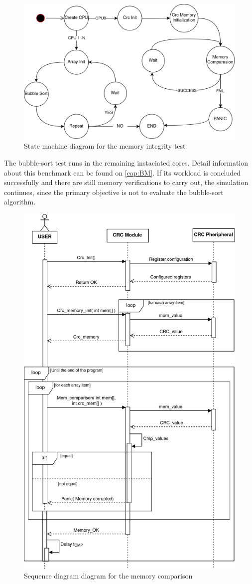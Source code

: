 \begin{figure}[H]
	\centering
 	\includegraphics[width=0.7\linewidth]{Images/MemoryIntegrity_StateDiagram.png}
 	\caption{State machine diagram for the memory integrity test}
	\label{fig_MemoryIntegrity_StateDiagram}
\end{figure}

The bubble-sort test runs in the remaining instaciated cores. Detail information about this benchmark can be found on \autoref{cap:BM}.
If its workload is concluded successfully and there are still memory verifications to carry out, the simulation continues, since 
the primary objective is not to evaluate the bubble-sort algorithm. 


\begin{figure}[H]
	\centering
 	\includegraphics[width=0.7\linewidth]{Images/MemoryIntegrity_CPU0SequenceDiagram.png}
 	\caption{Sequence diagram diagram for the memory comparison}
	\label{fig_MemoryIntegrity_CPU0SequenceDiagram}
\end{figure}

